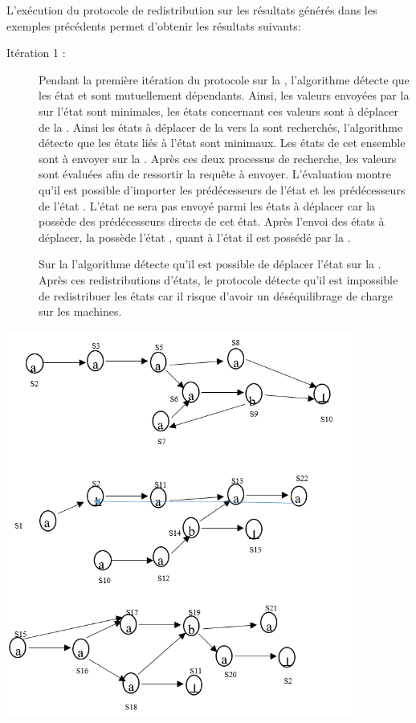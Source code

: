 \begin{Exemple}\label{ea5}
L'exécution du protocole de redistribution sur les résultats générés dans les exemples précédents permet d'obtenir  les résultats suivants:

\nopagebreak
\begin{description}
\item[Itération 1 :] Pendant la première itération du protocole sur la \mone{}, l'algorithme détecte que les état  et  sont mutuellement dépendants. Ainsi, les valeurs envoyées par la \mtwo{} sur l'état  sont minimales, les états concernant ces valeurs sont à déplacer de la \mtwo{}. Ainsi les états à déplacer de la \mone{} vers la \mtwo{} sont recherchés, l'algorithme détecte que les états liés à l'état  sont minimaux. Les états de cet ensemble sont à envoyer sur la \mtwo{}. Après ces deux processus de recherche, les valeurs sont évaluées afin de ressortir la requête à envoyer. L'évaluation montre qu'il est possible d'importer les prédécesseurs de l'état  et les prédécesseurs de  l'état .
L'état  ne sera pas envoyé parmi les états à déplacer car la \mtree{} possède des prédécesseurs directs de cet état. Après l'envoi des états à déplacer, la \mone{} possède l'état , quant à l'état  il est possédé par la \mtwo{}.


Sur la \mtree{} l'algorithme détecte qu'il est possible de déplacer l'état  sur la \mtwo{}.
   Après ces redistributions d'états, le protocole détecte qu'il est impossible de redistribuer les états car il risque d'avoir un déséquilibrage de charge sur les machines.
   
\end{description}
\centering
	\includegraphics[height=5in]{img/Rskd.png}
	
\end{Exemple}